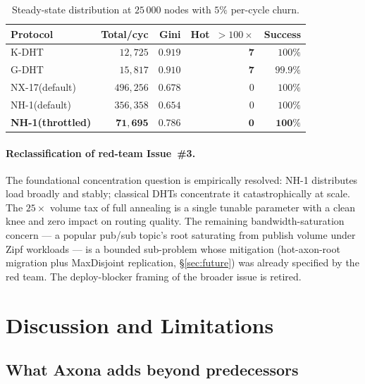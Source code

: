 \documentclass[conference]{IEEEtran}
\newcommand{\axona}{Axona\xspace}
\newcommand{\nhone}{NH-1\xspace}
\newcommand{\GDHT}{G-DHT\xspace}
\newcommand{\NXseventeen}{NX-17\xspace}
\begin{document}
\begin{table}[t]
\centering
\caption{Steady-state distribution at $25\,000$ nodes with $5\%$
per-cycle churn.}
\label{tab:bandwidth-churn}
\small
\begin{tabular}{@{}lrrrr@{}}
\toprule
\textbf{Protocol} & \textbf{Total/cyc} & \textbf{Gini} &
\textbf{Hot~$>100\times$} & \textbf{Success} \\
\midrule
\textsc{K-DHT} & $12{,}725$ & $0.919$ & $\mathbf{7}$ & $100\%$ \\
\GDHT & $15{,}817$ & $0.910$ & $\mathbf{7}$ & $99.9\%$ \\
\NXseventeen (default) & $496{,}256$ & $0.678$ & $0$ & $100\%$ \\
\nhone (default) & $356{,}358$ & $0.654$ & $0$ & $100\%$ \\
\textbf{\nhone (throttled)} & $\mathbf{71{,}695}$ & $\mathbf{0.786}$ &
$\mathbf{0}$ & $\mathbf{100\%}$ \\
\bottomrule
\end{tabular}
\end{table}

\paragraph{Reclassification of red-team Issue~\#3.} The foundational
concentration question is empirically resolved: \nhone distributes
load broadly and stably; classical DHTs concentrate it
catastrophically at scale. The $25\times$ volume tax of full
annealing is a single tunable parameter with a clean knee and zero
impact on routing quality. The remaining bandwidth-saturation concern
--- a popular pub/sub topic's root saturating from publish volume
under Zipf workloads --- is a bounded sub-problem whose mitigation
(hot-axon-root migration plus MaxDisjoint replication,
\S\ref{sec:future}) was already specified by the red team. The
deploy-blocker framing of the broader issue is retired.

\section{Discussion and Limitations}
\label{sec:discussion}

\subsection{What \axona adds beyond predecessors}
\end{document}
